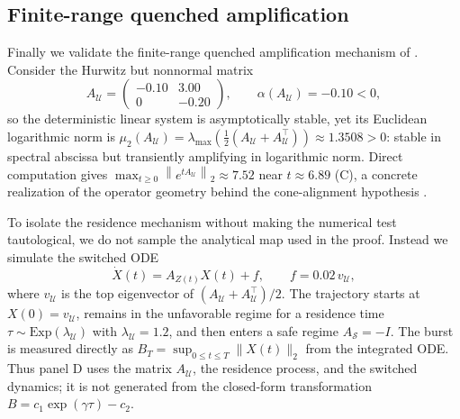 \documentclass[11pt]{article}
\theoremstyle{plain}
\theoremstyle{definition}
\theoremstyle{remark}
\newcommand{\abscissa}{\alpha}
\newcommand{\lognorm}{\mu_2}
\newcommand{\norm}[1]{\left\lVert #1 \right\rVert}
\newcommand{\HR}{\mathcal{U}}
\newcommand{\Safe}{\mathcal{S}}
\begin{document}
\subsection{Finite-range quenched amplification}
\label{subsec:numerical-finite-range-amplification}

Finally we validate the finite-range quenched amplification mechanism of
. Consider the Hurwitz but nonnormal matrix
\begin{equation}
    A_\HR=
    \begin{pmatrix}
        -0.10 & 3.00\\
        0     & -0.20
    \end{pmatrix},
    \qquad
    \abscissa(A_\HR)=-0.10<0,
    \label{eq:numerical-hurwitz-nonnormal}
\end{equation}
so the deterministic linear system is asymptotically stable, yet its Euclidean logarithmic norm is
$\lognorm(A_\HR)=\lambda_{\max}(\tfrac12(A_\HR+A_\HR^\top))\approx1.3508>0$: stable in spectral
abscissa but transiently amplifying in logarithmic norm. Direct computation gives
$\max_{t\ge0}\norm{e^{tA_\HR}}_2\approx7.52$ near $t\approx6.89$
(C), a concrete realization of the operator geometry behind the
cone-alignment hypothesis .

To isolate the residence mechanism without making the numerical test tautological, we do not
sample the analytical map used in the proof. Instead we simulate the switched ODE
\begin{equation}
    \dot X(t)=A_{Z(t)}X(t)+f,
    \qquad
    f=0.02\,v_\HR,
    \label{eq:numerical-switched-ode}
\end{equation}
where $v_\HR$ is the top eigenvector of $(A_\HR+A_\HR^\top)/2$. The trajectory starts at
$X(0)=v_\HR$, remains in the unfavorable regime for a residence time
$\tau\sim\mathrm{Exp}(\lambda_\HR)$ with $\lambda_\HR=1.2$, and then enters a safe regime
$A_{\Safe}=-I$. The burst is measured directly as
$B_T=\sup_{0\le t\le T}\|X(t)\|_2$ from the integrated ODE. Thus panel D uses the matrix
$A_\HR$, the residence process, and the switched dynamics; it is not generated from the closed-form
transformation $B=c_1\exp(\gamma\tau)-c_2$.
\end{document}
